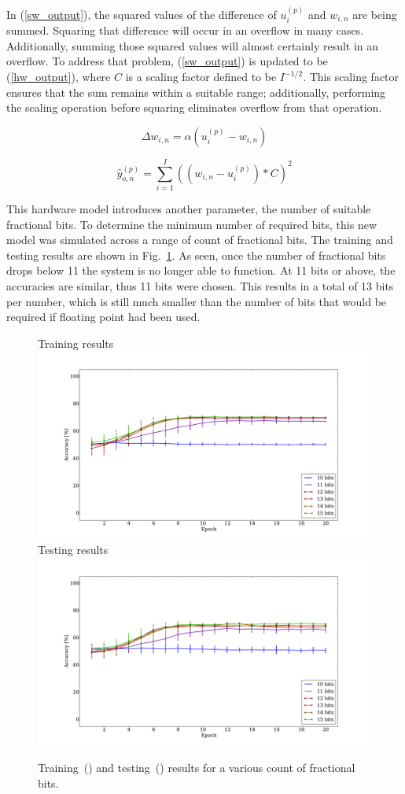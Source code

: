 \documentclass[10pt,journal]{IEEEtran}
\newcommand{\fig}[1]{Fig.~\ref{#1}}
\newcommand{\eq}[1]{(\ref{#1})}
\begin{document}
				In \eq{sw_output}, the squared values of the difference of \(u_i^{(p)}\) and \(w_{i,n}\) are being summed. Squaring that difference will occur in an overflow in many cases. Additionally, summing those squared values will almost certainly result in an overflow. To address that problem, \eq{sw_output} is updated to be \eq{hw_output}, where \(C\) is a scaling factor defined to be \(I^{-1/2}\). This scaling factor ensures that the sum remains within a suitable range; additionally, performing the scaling operation before squaring eliminates overflow from that operation.
				
				\begin{equation}
					\label{hw_weight_update}
					\Delta w_{i,n} = \alpha(u_i^{(p)}-w_{i,n})
				\end{equation}
				
				\begin{equation}
					\label{hw_output}
					\hat{y}_{o,n}^{(p)} = \displaystyle\sum_{i=1}^{I}((w_{i,n} - u_i^{(p)})*C)^2
				\end{equation}
				
				This hardware model introduces another parameter, the number of suitable fractional bits. To determine the minimum number of required bits, this new model was simulated across a range of count of fractional bits. The training and testing results are shown in \fig{fig:fractional_bits}. As seen, once the number of fractional bits drops below 11 the system is no longer able to function. At 11 bits or above, the accuracies are similar, thus 11 bits were chosen. This results in a total of 13 bits per number, which is still much smaller than the number of bits that would be required if floating point had been used.
				
				\begin{figure}[t!]
					\captionsetup[subfigure]{position=b}
					\centering
					\hfill
					\subcaptionbox
					{
						Training results
						\label{fig:sw_fractional_bits:training}
					}
					{\includegraphics[width=0.49\linewidth]{sw_fractional_bits_training}}
					\hfill
					\subcaptionbox
					{
						Testing results
						\label{fig:sw_fractional_bits:testing}
					}
					{\includegraphics[width=0.49\linewidth]{sw_fractional_bits_testing}}
					\hfill
					\caption{Training~() and testing~() results for a various count of fractional bits.}
					\label{fig:fractional_bits}
				\end{figure}
		
\end{document}
